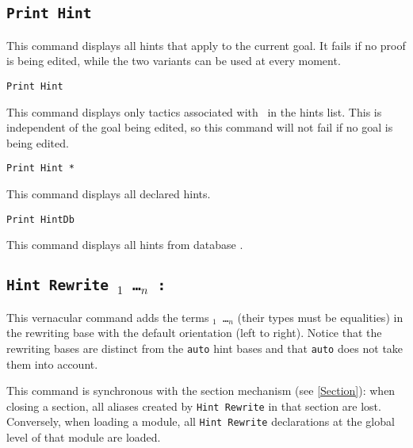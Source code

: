 \subsection{\tt Print Hint
\label{PrintHint}
}

This command displays all hints that apply to the current goal. It
fails if no proof is being edited, while the two variants can be used at
every moment.

\begin{Variants}

\item {\tt  Print Hint {\ident} }

 This command displays only tactics associated with \ident\ in the
 hints list. This is independent of the goal being edited, so this
 command will not fail if no goal is being edited.

\item {\tt Print Hint *}

  This command displays all declared hints. 

\item {\tt  Print HintDb {\ident} }
\label{PrintHintDb}

 This command displays all hints from database \ident.

\end{Variants}

\subsection{\tt Hint Rewrite \term$_1$ \dots \term$_n$ : \ident
\label{HintRewrite}
}

This vernacular command adds the terms {\tt \term$_1$ \dots \term$_n$}
(their types must be equalities) in the rewriting base {\tt \ident}
with the default orientation (left to right). Notice that the
rewriting bases are distinct from the {\tt auto} hint bases and that
{\tt auto} does not take them into account.

This command is synchronous with the section mechanism (see \ref{Section}):
when closing a section, all aliases created by \texttt{Hint Rewrite} in that
section are lost. Conversely, when loading a module, all \texttt{Hint Rewrite}
declarations at the global level of that module are loaded.

